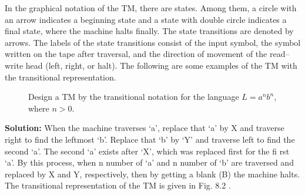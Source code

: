 \documentclass[fontsize=8pt,paper=A4, DIV=9]{scrartcl}
\begin{document}
In the graphical notation of the TM, there are states. Among them, a circle with an arrow indicates a
beginning state and a state with double circle indicates a final state, where the machine halts finally. The state
transitions are denoted by arrows. The labels of the state transitions consist of the input symbol, the symbol
written on the tape after traversal, and the direction of movement of the read–write head (left, right, or halt).
The following are some examples of the TM with the transitional representation.

% 






    \begin{figure}[H] %
   Design a TM by the transitional notation for the language $L = a^{n}
b^{n}$, where $ n > 0$.
\end{figure}
\textbf{Solution:} When the machine traverses ‘a’, replace that ‘a’ by X and traverse right to find the leftmost
‘b’. Replace that ‘b’ by ‘Y’ and traverse left to find the second ‘a’. The second ‘a’ exists after ‘X’, which
was replaced first for the fi rst ‘a’. By this process, when n number of ‘a’ and n number of ‘b’ are traversed and replaced by X and Y, respectively, then by getting a blank (B) the machine halts.
The transitional representation of the TM is given in Fig. 8.2 .
\end{document}
